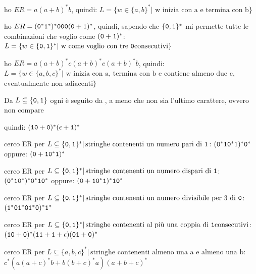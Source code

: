 \begin{example}
	ho $ER=a(a+b)^*b$, quindi:
	$L=\{w\in\{a,b\}^*|\text{ w inizia con a e termina con b}\}$
\end{example}

\begin{example}
	ho $ER=(\mathtt{0}^*\mathtt{1}^*)^*\mathtt{0}\mathtt{0}\mathtt{0}(\mathtt{0}+\mathtt{1})^*$, quindi, sapendo che $\{\mathtt{0},\mathtt{1}\}^*$ mi permette tutte le combinazioni che voglio come $(\mathtt{0}+\mathtt{1})^*$:
	$L=\{w\in\{\zero,\uno\}^*|\text{ w come voglio con tre \zero consecutivi}\}$
\end{example}
\begin{example}
	ho $ER=a(a+b)^*c(a+b)^*c(a+b)^*b$, quindi:
	$L=\{w\in\{a,b,c\}^*|\text{ w inizia con a, termina con b  e contiene almeno due c, }$
	$\text{eventualmente non adiacenti}\}$
\end{example}
\begin{example}
	Da $L\subseteq\{\mathtt{0},\mathtt{1}\}$
	ogni \uno è seguito da \zero, a meno che non sia l'ultimo carattere, ovvero \uno\uno non compare

	quindi:
	$(\mathtt{1}\mathtt{0}+\mathtt{0})^*(\epsilon+\mathtt{1})^*$
\end{example}
\begin{example}
	cerco ER per $L\subseteq\{\mathtt{0},\mathtt{1}\}^*|\, \text{stringhe contenenti un numero pari di \ensuremath{\mathtt{1}}}$:
	$(\mathtt{0}^*\mathtt{1}\mathtt{0}^*\mathtt{1})^*\mathtt{0}^*$
	oppure:
	$(\mathtt{0}+\mathtt{1}\mathtt{0}^*\mathtt{1})^*$
\end{example}
\begin{example}
	cerco ER per $L\subseteq\{\mathtt{0},\mathtt{1}\}^*|\, \text{stringhe contenenti un numero dispari di \ensuremath{\mathtt{1}}}$:
	$(\mathtt{0}^*\mathtt{1}\mathtt{0}^*)^*\mathtt{0}^*\mathtt{1}\mathtt{0}^*$
	oppure:
	$(\mathtt{0}+\mathtt{1}\mathtt{0}^*\mathtt{1})^*\mathtt{1}\mathtt{0}^*$
\end{example}
\begin{example}
	cerco ER per $L\subseteq\{\mathtt{0},\mathtt{1}\}^*|\, \text{stringhe contenenti un numero divisibile per 3 di \ensuremath{\mathtt{0}}}$:
	$(\mathtt{1}^*\mathtt{0}\mathtt{1}^*\mathtt{0}\mathtt{1}^*\mathtt{0})^*\mathtt{1}^*$
\end{example}
\begin{example}
	cerco ER per $L\subseteq\{\zero,\uno\}^*|\, \text{stringhe contenenti al più una coppia di \uno consecutivi}$:
	$(\mathtt{1}\mathtt{0}+\mathtt{0})^*(\mathtt{1}\mathtt{1}+\mathtt{1}+\epsilon)(\mathtt{0}\mathtt{1}+\mathtt{0})^*$
\end{example}
\begin{example}
	cerco ER per $L\subseteq\{a,b,c\}^*|\, \text{stringhe contenenti almeno una a e almeno una b}:$
	$c^*\left(a(a+c)^*b+b(b+c)^*a\right)(a+b+c)^*$
\end{example}

